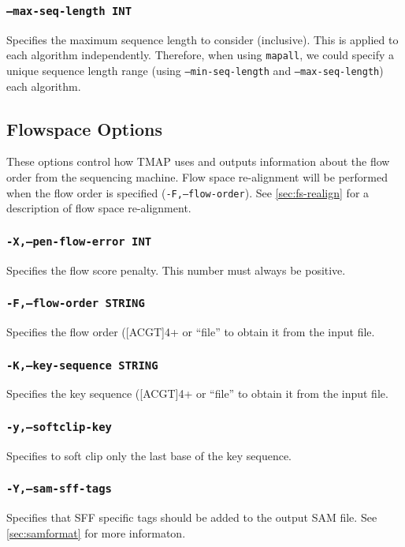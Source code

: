 \documentclass[a4paper,12pt]{book}
\newcommand{\TT}[1]{{\tt #1}} %
\begin{document}
\subsubsection{\TT{--max-seq-length INT}}
Specifies the maximum sequence length to consider (inclusive).
This is applied to each algorithm independently.
Therefore, when using \TT{mapall}, we could specify a unique sequence length range (using \TT{---min-seq-length} and \TT{---max-seq-length}) each algorithm.

\subsection{Flowspace Options}
These options control how TMAP uses and outputs information about the flow order from the sequencing machine.
Flow space re-alignment will be performed when the flow order is specified (\TT{-F,--flow-order}).
See \autoref{sec:fs-realign} for a description of flow space re-alignment.

\subsubsection{\TT{-X,--pen-flow-error INT}}
Specifies the flow score penalty.
This number must always be positive.

\subsubsection{\TT{-F,--flow-order STRING}}
Specifies the flow order ([ACGT]{4+} or ``file'' to obtain it from the input file.

\subsubsection{\TT{-K,--key-sequence STRING}}
Specifies the key sequence ([ACGT]{4+} or ``file'' to obtain it from the input file.

\subsubsection{\TT{-y,--softclip-key}}
Specifies to soft clip only the last base of the key sequence.

\subsubsection{\TT{-Y,--sam-sff-tags}}
Specifies that SFF specific tags should be added to the output SAM file.
See \autoref{sec:samformat} for more informaton.
\end{document}
